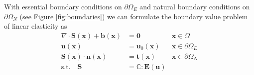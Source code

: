 With essential boundary conditions on $\partial \Omega_E$ and natural boundary conditions on $\partial \Omega_N$ (see Figure \ref{fig:boundaries}) we can formulate the boundary value problem of linear elasticity as 
\begin{align}
    \nabla \cdot \mathbf{S}(\mathbf{x}) + \mathbf{b}(\mathbf{x}) &= \mathbf{0} 
        &\mathbf{x} \in \Omega \\
    \mathbf{u}(\mathbf{x}) 
    &= \mathbf{u}_0 (\mathbf{x}) 
        &\mathbf{x} \in \partial \Omega_E \\
    \mathbf{S}(\mathbf{x}) \cdot \mathbf{n}(\mathbf{x}) 
    &= \mathbf{t} (\mathbf{x}) 
        &\mathbf{x} \in \partial \Omega_N\\
    \textrm{s.t.} \quad \mathbf{S} &= \mathbb{C} : \mathbf{E}(\mathbf{u})
\end{align}
